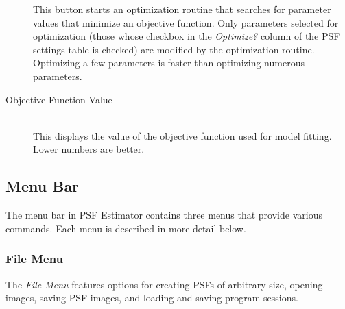 \documentclass[11pt,titlepage,twoside]{article}
\begin{document}
\begin{description}
  This button starts an optimization routine that searches for parameter values that minimize an objective function. Only parameters selected for optimization (those whose checkbox in the \emph{Optimize?} column of the PSF settings table is checked) are modified by the optimization routine. Optimizing a few parameters is faster than optimizing numerous parameters.
  
  \item[Objective Function Value] \hfill \\
  
  This displays the value of the objective function used for model fitting. Lower numbers are better.

\end{description}




\subsection{Menu Bar}

The menu bar in PSF Estimator contains three menus that provide various commands. Each menu is described in more detail below.

\subsubsection{File Menu}

The \emph{File Menu} features options for creating PSFs of arbitrary size, opening images, saving PSF images, and loading and saving program sessions.
\end{document}
